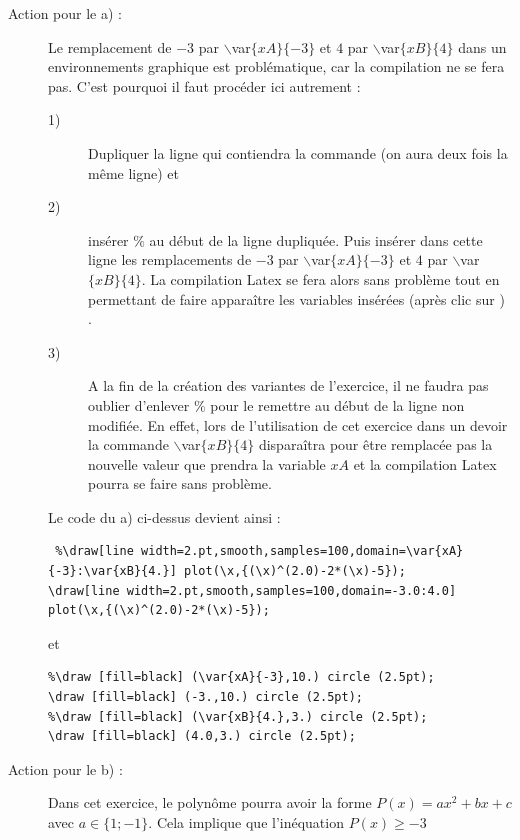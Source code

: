 {\begin{description}
\end{description}




\begin{description}
 \item[Action pour le a) : ] 
\begin{bug} 
 Le remplacement de $-3$ par $\backslash$var$\{xA\}\{-3\}$ et  $4$ par $\backslash$var$\{xB\}\{4\}$ dans un environnements graphique est problématique, car la compilation ne se fera pas. 
 C'est pourquoi il faut procéder ici autrement :
 \begin{description}
  \item [1)] Dupliquer la ligne qui contiendra la commande (on aura deux fois la même ligne) et 
  \item[2)] insérer $\%$ au début de la ligne dupliquée. Puis insérer dans cette ligne les remplacements de $-3$ par $\backslash$var$\{xA\}\{-3\}$ et  $4$ par $\backslash$var$\{xB\}\{4\}$. 
  La compilation Latex se fera alors sans problème tout en permettant de faire apparaître les variables insérées (après clic sur ) .   
  \item[3)] A la fin de la création des variantes de l'exercice, il ne faudra pas oublier d'enlever $\%$ pour le remettre au début de la ligne non modifiée. 
  En effet, lors de l'utilisation de cet exercice dans un devoir la commande $\backslash$var$\{xB\}\{4\}$ disparaîtra pour 
  être remplacée pas la nouvelle valeur que prendra la variable $xA$ et la compilation Latex pourra se faire sans problème. 
 \end{description}
Le code du a) ci-dessus devient ainsi : 
 \begin{verbatim}
 %\draw[line width=2.pt,smooth,samples=100,domain=\var{xA}{-3}:\var{xB}{4.}] plot(\x,{(\x)^(2.0)-2*(\x)-5});
\draw[line width=2.pt,smooth,samples=100,domain=-3.0:4.0] plot(\x,{(\x)^(2.0)-2*(\x)-5});
 \end{verbatim}
 et 
 \begin{verbatim}
%\draw [fill=black] (\var{xA}{-3},10.) circle (2.5pt);
\draw [fill=black] (-3.,10.) circle (2.5pt);
%\draw [fill=black] (\var{xB}{4.},3.) circle (2.5pt);
\draw [fill=black] (4.0,3.) circle (2.5pt);
 \end{verbatim}
\end{bug}
 \item[Action pour le b) : ]  Dans cet exercice, le polynôme pourra avoir la forme $P(x) = ax^2+bx+c$ avec $a\in \{1;-1\}$. Cela implique que l'inéquation $P(x)\geq -3$ 

\end{description}}
